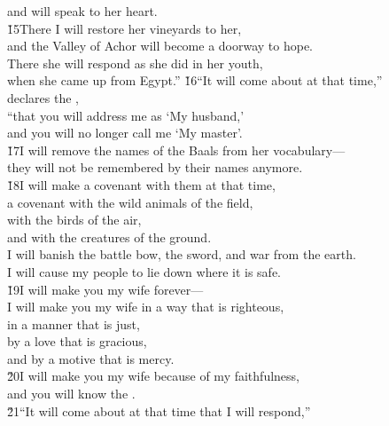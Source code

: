 \begin{poetry}
\poemlll       and will speak to her heart. \\
\poeml \v{15}There I will restore her vineyards to her, \\
\poemll    and the Valley of Achor will become a doorway to hope. \\
\poeml There she will respond as she did in her youth, \\
\poemll    when she came up from Egypt.''
\poeml \v{16}``It will come about at that time,'' \\
\poemll    declares the , \\
\poeml ``that you will address me as `My husband,' \\
\poemll    and you will no longer call me `My master'. \\
\poeml \v{17}I will remove the names of the Baals from her vocabulary--- \\
\poemll    they will not be remembered by their names anymore. \\
\poeml \v{18}I will make a covenant with them at that time, \\
\poemll    a covenant with the wild animals of the field, \\
\poeml with the birds of the air, \\
\poemll    and with the creatures of the ground. \\
\poeml I will banish the battle bow, the sword, and war from the earth. \\
\poemll    I will cause my people to lie down where it is safe. \\
\poeml \v{19}I will make you my wife forever--- \\
\poeml I will make you my wife in a way that is righteous, \\
\poemll    in a manner that is just, \\
\poeml by a love that is gracious, \\
\poemll    and by a motive that is mercy. \\
\poeml \v{20}I will make you my wife because of my faithfulness, \\
\poemll    and you will know the . \\
\poeml \v{21}``It will come about at that time that I will respond,'' \\

\end{poetry}
